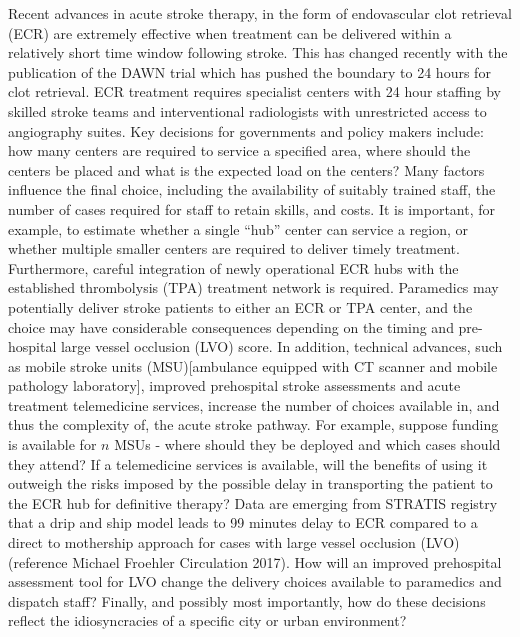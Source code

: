 \documentclass[utf8]{frontiersHLTH}
\begin{document}
Recent advances in acute stroke therapy, in the form of endovascular
clot retrieval
(ECR)\cite{berkhemer2015randomized,goyal2016endovascular,goyal2015randomized,campbell2015endovascular,saver2015stent}
are extremely effective when treatment can be delivered within a
relatively short time window following stroke. This has changed
recently with the publication of the DAWN trial which has pushed the
boundary to 24 hours for clot
retrieval\cite{nogueira2018thrombectomy}. ECR treatment requires
specialist centers with 24 hour staffing by skilled stroke teams and
interventional radiologists with unrestricted access to angiography
suites. Key decisions for governments and policy makers include: how
many centers are required to service a specified area, where should
the centers be placed and what is the expected load on the centers?
Many factors influence the final choice, including the availability of
suitably trained staff, the number of cases required for staff to
retain skills, and costs. It is important, for example, to estimate
whether a single ``hub'' center can service a region, or whether
multiple smaller centers are required to deliver timely
treatment. Furthermore, careful integration of newly operational ECR
hubs with the established thrombolysis (TPA)\cite{tnionda1995tissue}
treatment network is required. Paramedics may potentially deliver
stroke patients to either an ECR or TPA center, and the choice may
have considerable consequences depending on the timing and
pre-hospital large vessel occlusion (LVO) score. In addition,
technical advances, such as mobile stroke units (MSU)[ambulance
equipped with CT scanner and mobile pathology laboratory], improved
prehospital stroke assessments and acute treatment telemedicine
services, increase the number of choices available in, and thus the
complexity of, the acute stroke pathway. For example, suppose funding
is available for $n$ MSUs - where should they be deployed and which
cases should they attend? If a telemedicine services is available,
will the benefits of using it outweigh the risks imposed by the
possible delay in transporting the patient to the ECR hub for definitive therapy? Data are emerging from STRATIS registry that a drip and ship model leads to 99 minutes delay to ECR compared to a direct to mothership approach for cases with large vessel occlusion (LVO) (reference Michael Froehler Circulation 2017).   How will an improved prehospital assessment tool for LVO
change the delivery choices available to paramedics and dispatch
staff? Finally, and possibly most importantly, how do these decisions
reflect the idiosyncracies of a specific city or urban environment?
\end{document}
